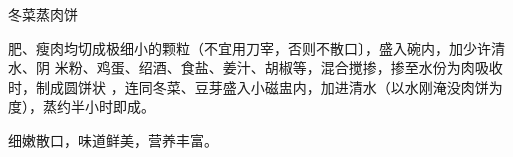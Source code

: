 \begin{recipe}{冬菜蒸肉饼}

\ingredients


\cooking

肥、瘦肉均切成极细小的颗粒（不宜用刀宰，否则不散口〕，盛入碗内，加少许清水、阴
米粉、鸡蛋、绍酒、食盐、姜汁、胡椒等，混合搅掺，掺至水份为肉吸收时，制成圆饼状
，连同冬菜、豆芽盛入小磁盅内，加进清水（以水刚淹没肉饼为度），蒸约半小时即成。

\features

细嫩散口，味道鲜美，营养丰富。

\end{recipe}

